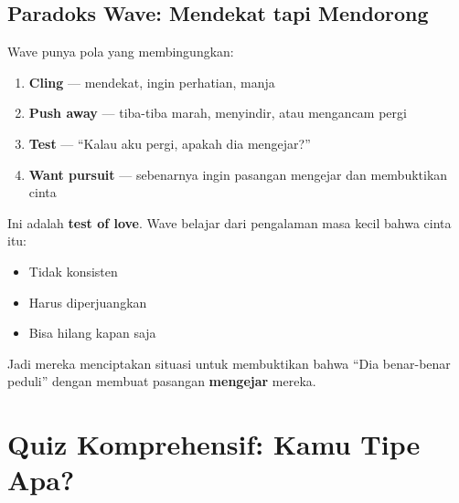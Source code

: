 \subsection{Paradoks Wave: Mendekat tapi Mendorong}

Wave punya pola yang membingungkan:
\begin{enumerate}
    \item \textbf{Cling} --- mendekat, ingin perhatian, manja
    \item \textbf{Push away} --- tiba-tiba marah, menyindir, atau mengancam pergi
    \item \textbf{Test} --- ``Kalau aku pergi, apakah dia mengejar?''
    \item \textbf{Want pursuit} --- sebenarnya ingin pasangan mengejar dan membuktikan cinta
\end{enumerate}

\begin{praktikbox}
Ini adalah \textbf{test of love}. Wave belajar dari pengalaman masa kecil bahwa cinta itu:
\begin{itemize}
    \item Tidak konsisten
    \item Harus diperjuangkan
    \item Bisa hilang kapan saja
\end{itemize}

Jadi mereka menciptakan situasi untuk membuktikan bahwa ``Dia benar-benar peduli'' dengan membuat pasangan \textbf{mengejar} mereka.
\end{praktikbox}

\section{Quiz Komprehensif: Kamu Tipe Apa?}

